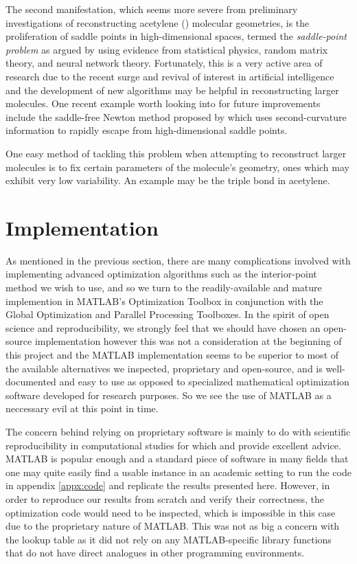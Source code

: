 The second manifestation, which seems more severe from preliminary investigations of reconstructing acetylene () molecular geometries, is the proliferation of saddle points in high-dimensional spaces, termed the \emph{saddle-point problem} as argued by \citet{Pascanu14} using evidence from statistical physics, random matrix theory, and neural network theory. Fortunately, this is a very active area of research due to the recent surge and revival of interest in artificial intelligence \citep{Bengio16,LeCun15} and the development of new algorithms may be helpful in reconstructing larger molecules. One recent example worth looking into for future improvements include the saddle-free Newton method proposed by \citet{Dauphin14} which uses second-curvature information to rapidly escape from high-dimensional saddle points.

One easy method of tackling this problem when attempting to reconstruct larger molecules is to fix certain parameters of the molecule's geometry, ones which may exhibit very low variability. An example may be the triple  bond in acetylene.

\section{Implementation}
As mentioned in the previous section, there are many complications involved with implementing advanced optimization algorithms such as the interior-point method we wish to use, and so we turn to the readily-available and mature implemention in MATLAB's Optimization Toolbox in conjunction with the Global Optimization and Parallel Processing Toolboxes. In the spirit of open science and reproducibility, we strongly feel that we should have chosen an open-source implementation however this was not a consideration at the beginning of this project and the MATLAB implementation seems to be superior to most of the available alternatives we inspected, proprietary and open-source, and is well-documented and easy to use as opposed to specialized mathematical optimization software developed for research purposes. So we see the use of MATLAB as a neccessary evil at this point in time.

The concern behind relying on proprietary software is mainly to do with scientific reproducibility in computational studies \citep{Easterbrook14} for which \citet{Millman14} and \citet{Wilson14} provide excellent advice. MATLAB is popular enough and a standard piece of software in many fields that one may quite easily find a usable instance in an academic setting to run the code in appendix \ref{appx:code} and replicate the results presented here. However, in order to reproduce our results from scratch and verify their correctness, the optimization code would need to be inspected, which is impossible in this case due to the proprietary nature of MATLAB. This was not as big a concern with the lookup table as it did not rely on any MATLAB-specific library functions that do not have direct analogues in other programming environments.

